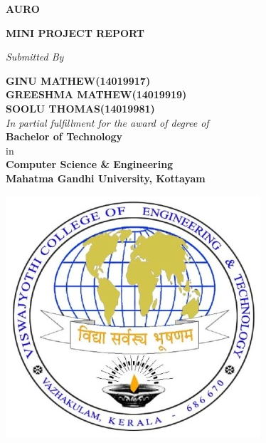 \documentclass[a4 paper,11pt]{report}
\begin{document}
\begin{titlepage}
    \begin{center}
        
\Huge
        \textbf{AURO}
        
        \vspace{1cm}
        \large \textbf{MINI PROJECT REPORT}
        
        \vspace{.4cm}
		\textit{Submitted By}
		
		\vspace{.4cm}      
        \large \textbf{GINU MATHEW\hspace{21mm}(14019917)}\\
        \large \textbf{GREESHMA MATHEW\hspace{6mm}(14019919)}\\
        \large \textbf{SOOLU THOMAS\hspace{19mm}(14019981)}\\
        
        \vspace{.6cm}
        \textit{In partial fulfillment for the award of degree of} \\
        
        \vspace{.4cm}
        \large \textbf{Bachelor of Technology}\\
        \vspace{.4cm}
        in \\
        \vspace{.4cm}
        \large \textbf{Computer Science \& Engineering} \\
        \vspace{0.1cm}
		\large \textbf{Mahatma Gandhi University, Kottayam}
        
        \vspace{0.4cm}
        
        \includegraphics{vjcet.jpg}
                

\end{center}
\end{titlepage}
\end{document}
